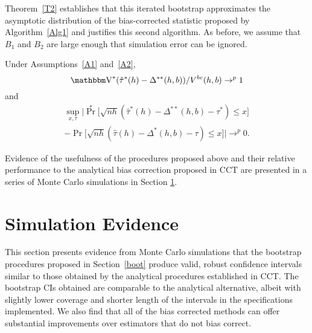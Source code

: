 \documentclass[12pt,fleqn]{article}
\begin{document}
Theorem~\ref{T2} establishes that this iterated bootstrap approximates the
asymptotic distribution of the bias-corrected statistic proposed by
Algorithm~\ref{Alg1} and justifies this second algorithm.  As before, we assume
that $B_1$ and $B_2$ are large enough that simulation error can be ignored.

\begin{theorem}\label{T2}
  Under Assumptions~\ref{A1} and~\ref{A2},
  \begin{equation*}
    \V^*(\hat\tau^{*}(h) - \Delta^{**}(h,b))/V^{bc}(h,b) \to^p 1
  \end{equation*}
  and
  \begin{multline*}
    \sup_{x,\tau}
    \Big\rvert \Pr^*\big[ \sqrt{nh}
    (\hat\tau^{*}(h) - \Delta^{**}(h,b) - \tau^*) \leq x \big] \\
    - \Pr\big[ \sqrt{nh}
    (\hat\tau(h) - \Delta^*(h,b) - \tau) \leq x \big] \Big\lvert \to^p 0.
  \end{multline*}
\end{theorem}

Evidence of the usefulness of the procedures proposed above and their relative performance to the analytical bias correction proposed in CCT are presented in a series of Monte Carlo simulations in Section \ref{sim}.

\section{Simulation Evidence}\label{sim}
This section presents evidence from Monte Carlo simulations that the bootstrap
procedures proposed in Section~\ref{boot} produce valid, robust confidence
intervals similar to those obtained by the analytical procedures established
in CCT. The bootstrap CIs obtained are comparable to the analytical
alternative, albeit with slightly lower coverage and shorter
length of the intervals in the specifications implemented. We also find that
all of the bias corrected methods can offer substantial improvements over
estimators that do not bias correct.
\end{document}
